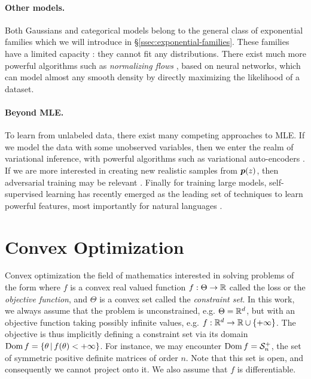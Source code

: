 \paragraph{Other models.}
Both Gaussians and categorical models belong to the general class of exponential families which we will introduce in \S\ref{ssec:exponential-families}.
These families have a limited capacity : they cannot fit any distributions.
There exist much more powerful algorithms such as \emph{normalizing flows} \citep{rezende2015variational}, based on neural networks, which can model almost any smooth density by directly maximizing the likelihood of a dataset.

\paragraph{Beyond MLE.} 
To learn from unlabeled data, there exist many competing approaches to MLE. 
If we model the data with some unobserved variables, then we enter the realm of variational inference, with powerful algorithms such as variational auto-encoders \citep{kingma2013auto}. 
If we are more interested in creating new realistic samples from $\bm{p}(z)$, then adversarial training may be relevant \citep{goodfellow2014generative}.
Finally for training large models, self-supervised learning has recently emerged as the leading set of techniques to learn powerful features, most importantly for natural languages \citep{peters2018deep,devlin2018bert}.


\section{Convex Optimization}
Convex optimization the field of mathematics interested in solving problems of the form
where $f$ is a convex real valued function $f:\Theta \rightarrow \mathbb{R}$ called the loss or the \emph{objective function}, and $\Theta$ is a convex set called the \emph{constraint set}.
In this work, we always assume that the problem is unconstrained, e.g. $\Theta = \mathbb{R}^d$, 
but with an objective function taking possibly infinite values, e.g. $f : \mathbb{R}^d \rightarrow \mathbb{R} \cup \{+\infty\}$. 
The objective is thus implicitly defining a constraint set via its domain $\operatorname{\mathrm{Dom}} f = \{ \theta \,\vert\, f(\theta) < +\infty \}$.
For instance, we may encounter $\operatorname{\mathrm{Dom}} f = {\mathcal S}_n^+$, the set of symmetric positive definite matrices of order $n$. Note that this set is open, and consequently we cannot project onto it.
We also assume that $f$ is differentiable.

